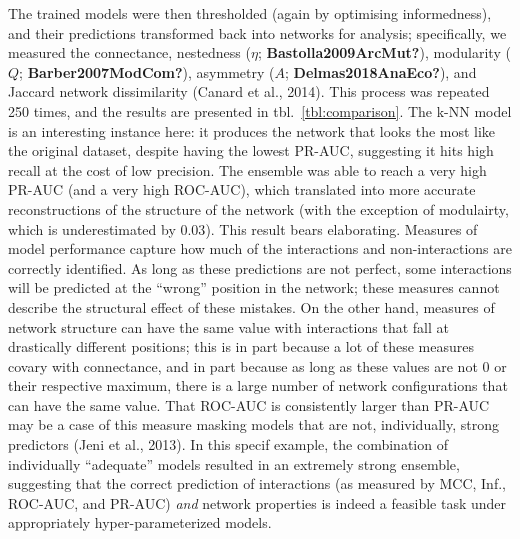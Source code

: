 \documentclass[11pt]{article}
\begin{document}
The trained models were then thresholded (again by optimising
informedness), and their predictions transformed back into networks for
analysis; specifically, we measured the connectance, nestedness
(\(\eta\); \textbf{Bastolla2009ArcMut?}), modularity (\(Q\);
\textbf{Barber2007ModCom?}), asymmetry (\(A\);
\textbf{Delmas2018AnaEco?}), and Jaccard network dissimilarity (Canard
et al., 2014). This process was repeated 250 times, and the results are
presented in tbl.~\ref{tbl:comparison}. The k-NN model is an interesting
instance here: it produces the network that looks the most like the
original dataset, despite having the lowest PR-AUC, suggesting it hits
high recall at the cost of low precision. The ensemble was able to reach
a very high PR-AUC (and a very high ROC-AUC), which translated into more
accurate reconstructions of the structure of the network (with the
exception of modulairty, which is underestimated by \(0.03\)). This
result bears elaborating. Measures of model performance capture how much
of the interactions and non-interactions are correctly identified. As
long as these predictions are not perfect, some interactions will be
predicted at the ``wrong'' position in the network; these measures
cannot describe the structural effect of these mistakes. On the other
hand, measures of network structure can have the same value with
interactions that fall at drastically different positions; this is in
part because a lot of these measures covary with connectance, and in
part because as long as these values are not 0 or their respective
maximum, there is a large number of network configurations that can have
the same value. That ROC-AUC is consistently larger than PR-AUC may be a
case of this measure masking models that are not, individually, strong
predictors (Jeni et al., 2013). In this specif example, the combination
of individually ``adequate'' models resulted in an extremely strong
ensemble, suggesting that the correct prediction of interactions (as
measured by MCC, Inf., ROC-AUC, and PR-AUC) \emph{and} network
properties is indeed a feasible task under appropriately
hyper-parameterized models.
\end{document}
